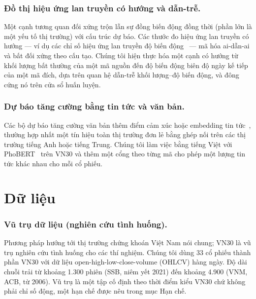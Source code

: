 \documentclass[runningheads]{llncs}
\begin{document}
\subsubsection{Đồ thị hiệu ứng lan truyền có hướng và dẫn-trễ.}
Một cạnh tương quan đối xứng trộn lẫn sự đồng biến động đồng thời (phần lớn là một yếu tố thị trường) với
cấu trúc dự báo. Các thước đo hiệu ứng lan truyền có hướng --- ví dụ các chỉ số hiệu ứng lan truyền độ
biến động~\cite{diebold2012} --- mã hóa ai-dẫn-ai và bất đối xứng theo cấu tạo. Chúng tôi hiện thực hóa
một cạnh có hướng từ khối lượng bất thường của một mã nguồn đến độ biến động biên độ ngày kế tiếp của một
mã đích, dựa trên quan hệ dẫn-trễ khối lượng--độ biến động, và đông cứng nó trên cửa sổ huấn luyện.

\subsubsection{Dự báo tăng cường bằng tin tức và văn bản.}
Các bộ dự báo tăng cường văn bản thêm điểm cảm xúc hoặc embedding tin tức~\cite{ouyang2021,das2024},
thường hợp nhất một tín hiệu toàn thị trường đơn lẻ bằng ghép nối trên các thị trường tiếng Anh hoặc
tiếng Trung. Chúng tôi làm việc bằng tiếng Việt với PhoBERT~\cite{phobert2020} trên VN30 và thêm một cổng
theo từng mã cho phép một lượng tin tức khác nhau cho mỗi cổ phiếu.

\section{Dữ liệu}
\label{sec:data}

\subsubsection{Vũ trụ dữ liệu (nghiên cứu tình huống).}
Phương pháp hướng tới thị trường chứng khoán Việt Nam nói chung; VN30 là vũ trụ nghiên cứu tình huống
cho các thí nghiệm. Chúng tôi dùng 33 cổ phiếu thành phần VN30 với dữ liệu open-high-low-close-volume
(OHLCV) hàng ngày. Độ dài chuỗi trải từ khoảng 1.300 phiên (SSB, niêm yết 2021) đến khoảng 4.900 (VNM,
ACB, từ 2006). Vũ trụ là một tập cố định theo thời điểm kiểu VN30 chứ không phải chỉ số động, một hạn chế
được nêu trong mục Hạn chế.
\end{document}
